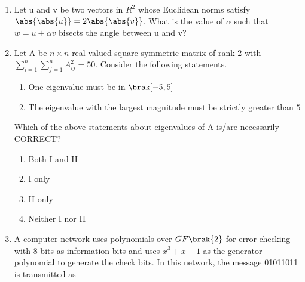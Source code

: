 \documentclass[a4paper, 11pt]{article}
\begin{document}
\begin{enumerate}
    \hfill{}

    \item Let u and v be two vectors in $R^{2}$ whose Euclidean norms satisfy $\abs{\abs{u}}=2\abs{\abs{v}}$. What is the value of $\alpha$ such that $w=u+\alpha v$ bisects the angle between u and v?
    \begin{enumerate}
    \end{enumerate}
    
    \hfill{}

    \item Let A be $n\times n$ real valued square symmetric matrix of rank 2 with $\sum_{i=1}^{n}\sum_{j=1}^{n}A_{ij}^{2}=50.$ Consider the following statements.
    \begin{enumerate}[label=\Roman*]
        \item One eigenvalue must be in $\brak[-5, 5]$
        \item The eigenvalue with the largest magnitude must be strictly greater than $5$
    \end{enumerate}
    
    Which of the above statements about eigenvalues of A is/are necessarily CORRECT?
    \begin{enumerate}
        \item Both I and II
        \item I only
        \item II only
        \item Neither I nor II
    \end{enumerate}
    
    \hfill{}

    \item A computer network uses polynomials over $GF\brak{2}$ for error checking with 8 bits as information bits and uses $x^{3}+x+1$ as the generator polynomial to generate the check bits. In this network, the message 01011011 is transmitted as
    \begin{enumerate}
    \end{enumerate}
    

\end{enumerate}
\end{document}

